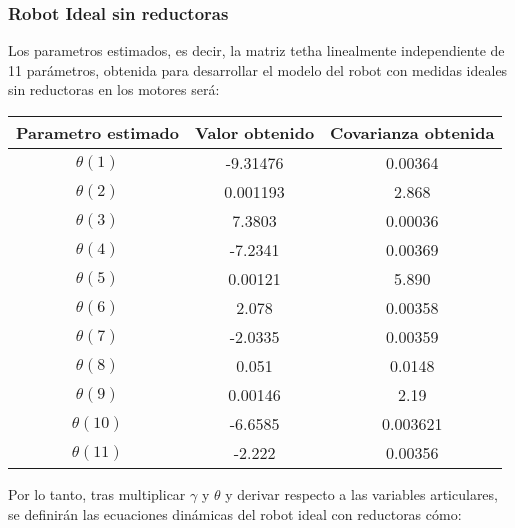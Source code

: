 \subsubsection{Robot Ideal sin reductoras}
Los parametros estimados, es decir, la matriz tetha linealmente independiente de 11 parámetros, obtenida para desarrollar el modelo del robot con medidas ideales sin reductoras en los motores será:
\begin{center}
	\begin{tabular}{| c | c | c |}

		\hline
		Parametro estimado & Valor obtenido & Covarianza obtenida \\
		\hline
		$\theta(1) $ & -9.31476 & 0.00364 \\
		\hline
		$\theta(2) $ & 0.001193 & 2.868 \\
		\hline
		$\theta(3) $ & 7.3803 & 0.00036 \\
		\hline
		$\theta(4) $ & -7.2341 & 0.00369 \\
		\hline
		$\theta(5) $ & 0.00121 & 5.890 \\
		\hline
		$\theta(6) $ & 2.078 & 0.00358 \\
		\hline
		$\theta(7) $ & -2.0335 & 0.00359 \\
		\hline
		$\theta(8) $ & 0.051 & 0.0148 \\
		\hline
		$\theta(9) $ & 0.00146 & 2.19 \\
		\hline
		$\theta(10) $ & -6.6585 & 0.003621 \\
		\hline
		$\theta(11) $ & -2.222 & 0.00356 \\
		\hline
	\end{tabular}
\end{center}
Por lo tanto, tras multiplicar $\gamma$ y $\theta$ y derivar respecto a las variables articulares, se definirán las ecuaciones dinámicas del robot ideal con reductoras cómo:\\

